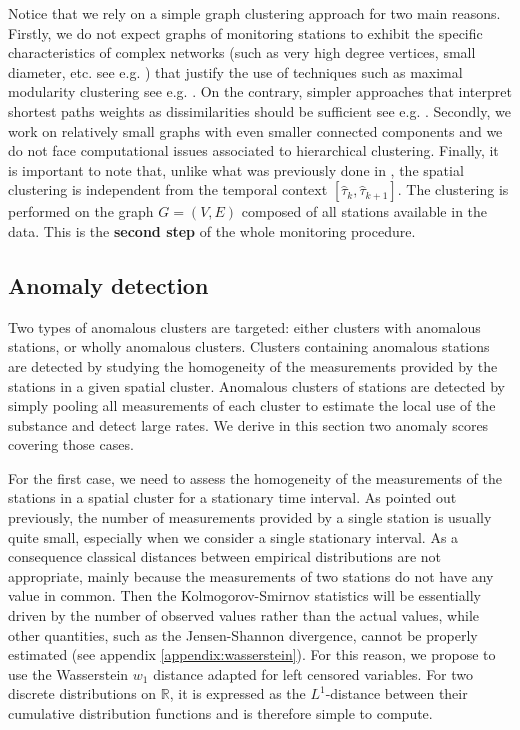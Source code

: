 Notice that we rely on a simple graph clustering approach for two main reasons. Firstly, we do not expect graphs of monitoring stations to exhibit the specific characteristics of complex networks (such as very high degree vertices, small diameter, etc. see e.g. \cite{Newman2003GraphSurveySIAM}) that justify the use of techniques such as maximal modularity clustering see e.g. \cite{FortunatoSurveyGraphs2010}. On the contrary, simpler approaches that interpret shortest paths weights as dissimilarities should be sufficient see e.g. \cite{Schaeffer:COSREV2007}. Secondly, we work on relatively small graphs with even smaller connected components and we do not face computational issues associated to hierarchical clustering. 
Finally, it is important to note that, unlike what was previously done in \cite{Laroche2022}, the spatial clustering is independent from the temporal context $[\widehat{\tau}_k,\widehat{\tau}_{k+1}]$. The clustering is performed on the graph $G=(V,E)$ composed of all stations available in the data. This is the \textbf{second step} of the whole monitoring procedure.

\subsection{Anomaly detection}\label{section:anomaly}

Two types of anomalous clusters are targeted: either clusters with anomalous stations, or wholly anomalous clusters. Clusters containing anomalous stations are detected by studying the homogeneity of the measurements provided by the stations in a given spatial cluster. Anomalous clusters of stations are detected by simply pooling all measurements of each cluster to estimate the local use of the substance and detect large rates. We derive in this section two anomaly scores covering those cases.

For the first case, we need to assess the homogeneity of the measurements of the stations in a spatial cluster for a stationary time interval. As pointed out previously, the number of measurements provided by a single station is usually quite small, especially when we consider a single stationary interval. As a consequence classical distances between empirical distributions are not appropriate, mainly because the measurements of two stations do not have any value in common. Then the Kolmogorov-Smirnov statistics will be essentially driven by the number of observed values rather than the actual values, while other quantities, such as the Jensen-Shannon divergence, cannot be properly estimated (see appendix \ref{appendix:wasserstein}). For this reason, we propose to use the Wasserstein $w_1$ distance \cite{villani2009optimal} adapted for left censored variables. For two discrete distributions on $\mathbb{R}$, it is expressed as the $L^1$-distance between their cumulative distribution functions and is therefore simple to compute. 

